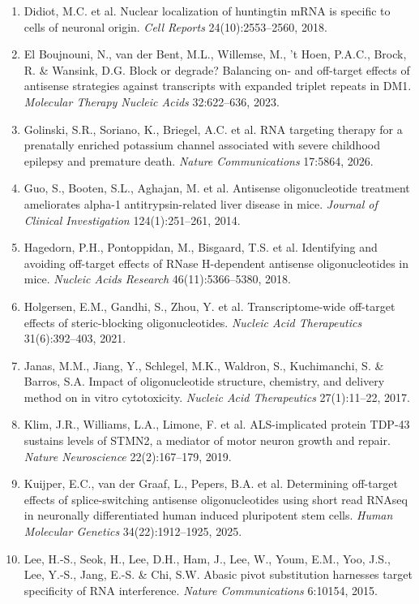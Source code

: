 \documentclass[11pt]{article}
\begin{document}
\begin{enumerate}[leftmargin=2em,itemsep=3pt]
\item Didiot, M.C. et al. Nuclear localization of huntingtin mRNA is specific to cells of neuronal origin. \textit{Cell Reports} 24(10):2553--2560, 2018.
\item El Boujnouni, N., van der Bent, M.L., Willemse, M., 't Hoen, P.A.C., Brock, R. \& Wansink, D.G. Block or degrade? Balancing on- and off-target effects of antisense strategies against transcripts with expanded triplet repeats in DM1. \textit{Molecular Therapy Nucleic Acids} 32:622--636, 2023.
\item Golinski, S.R., Soriano, K., Briegel, A.C. et al. RNA targeting therapy for a prenatally enriched potassium channel associated with severe childhood epilepsy and premature death. \textit{Nature Communications} 17:5864, 2026.
\item Guo, S., Booten, S.L., Aghajan, M. et al. Antisense oligonucleotide treatment ameliorates alpha-1 antitrypsin-related liver disease in mice. \textit{Journal of Clinical Investigation} 124(1):251--261, 2014.
\item Hagedorn, P.H., Pontoppidan, M., Bisgaard, T.S. et al. Identifying and avoiding off-target effects of RNase H-dependent antisense oligonucleotides in mice. \textit{Nucleic Acids Research} 46(11):5366--5380, 2018.
\item Holgersen, E.M., Gandhi, S., Zhou, Y. et al. Transcriptome-wide off-target effects of steric-blocking oligonucleotides. \textit{Nucleic Acid Therapeutics} 31(6):392--403, 2021.
\item Janas, M.M., Jiang, Y., Schlegel, M.K., Waldron, S., Kuchimanchi, S. \& Barros, S.A. Impact of oligonucleotide structure, chemistry, and delivery method on in vitro cytotoxicity. \textit{Nucleic Acid Therapeutics} 27(1):11--22, 2017.
\item Klim, J.R., Williams, L.A., Limone, F. et al. ALS-implicated protein TDP-43 sustains levels of STMN2, a mediator of motor neuron growth and repair. \textit{Nature Neuroscience} 22(2):167--179, 2019.
\item Kuijper, E.C., van der Graaf, L., Pepers, B.A. et al. Determining off-target effects of splice-switching antisense oligonucleotides using short read RNAseq in neuronally differentiated human induced pluripotent stem cells. \textit{Human Molecular Genetics} 34(22):1912--1925, 2025.
\item Lee, H.-S., Seok, H., Lee, D.H., Ham, J., Lee, W., Youm, E.M., Yoo, J.S., Lee, Y.-S., Jang, E.-S. \& Chi, S.W. Abasic pivot substitution harnesses target specificity of RNA interference. \textit{Nature Communications} 6:10154, 2015.

\end{enumerate}
\end{document}
